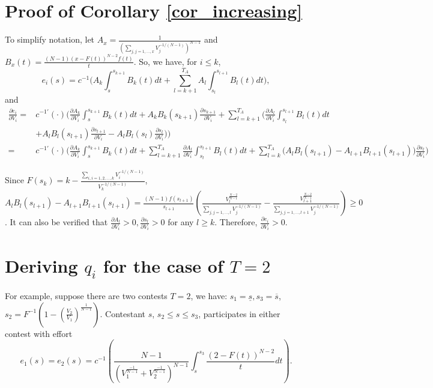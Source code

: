 \documentclass[12pt]{article}
\begin{document}
\section{Proof of Corollary \ref{cor_increasing}}

To simplify notation, let $A_{x}=\frac{1}{(\sum_{j,j=1,\dots,x}V_{j}^{-1/(N-1)})^{N-1}}$
and $B_{x}(t)=\frac{(N-1)(x-F(t))^{N-2}f(t)}{t}$. So, we have, for
$i\leq k$,
\[
e_{i}(s)=c^{-1}\Big(A_{k}\int_{s}^{s_{k+1}}B_{k}(t)dt+\sum_{l=k+1}^{T_{A}}A_{l}\int_{s_{l}}^{s_{l+1}}B_{l}(t)dt\Big),
\]
and
\begin{align*}
\frac{\partial e_{i}}{\partial V_{i}}= & c^{-1'}(\cdot)\Big(\frac{\partial A_{k}}{\partial V_{i}}\int_{s}^{s_{k+1}}B_{k}(t)dt+A_{k}B_{k}(s_{k+1})\frac{\partial s_{k+1}}{\partial V_{i}}+\sum_{l=k+1}^{T_{A}}\big(\frac{\partial A_{l}}{\partial V_{i}}\int_{s_{l}}^{s_{l+1}}B_{l}(t)dt\\
 & +A_{l}B_{l}(s_{l+1})\frac{\partial s_{l+1}}{\partial V_{i}}-A_{l}B_{l}(s_{l})\frac{\partial s_{l}}{\partial V_{i}}\big)\Big)\\
= & c^{-1'}(\cdot)\Big(\frac{\partial A_{k}}{\partial V_{i}}\int_{s}^{s_{k+1}}B_{k}(t)dt+\sum_{l=k+1}^{T_{A}}\frac{\partial A_{l}}{\partial V_{i}}\int_{s_{l}}^{s_{l+1}}B_{l}(t)dt+\sum_{l=k}^{T_{A}}\big(A_{l}B_{l}(s_{l+1})-A_{l+1}B_{l+1}(s_{l+1})\big)\frac{\partial s_{l}}{\partial V_{i}}\Big)
\end{align*}


Since $F(s_{k})=k-\frac{\sum_{i,i=1,2,\dots,k}V_{i}^{-1/(N-1)}}{V_{k}^{-1/(N-1)}}$,
$A_{l}B_{l}(s_{l+1})-A_{l+1}B_{l+1}(s_{l+1})=\frac{(N-1)f(s_{l+1})}{s_{l+1}}(\frac{V_{l}^{\frac{N-2}{N-1}}}{\sum_{j,j=1,\dots,l}V_{j}^{-1/(N-1)}}-\frac{V_{l+1}^{\frac{N-2}{N-1}}}{\sum_{j,j=1,\dots,l+1}V_{j}^{-1/(N-1)}})\geq0$.
It can also be verified that $\frac{\partial A_{l}}{\partial V_{i}}>0,\frac{\partial s_{l}}{\partial V_{i}}>0$
for any $l\geq k$. Therefore, $\frac{\partial e_{i}}{\partial V_{i}}>0$.

\section{Deriving $q_i$ for the case of $T=2$}

For example, suppose there are two contests $T=2$, we have: $s_{1}=\underline{s},s_{3}=\overline{s}$,
$s_{2}=F^{-1}(1-\left(\frac{V_{2}}{V_{1}}\right)^{\frac{1}{N-1}})$.
Contestant $s$, $s_{2}\leq s\leq s_{3}$, participates in either
contest with effort
\[
e_{1}(s)=e_{2}(s)=c^{-1}\left(\frac{N-1}{\left(V_{1}^{\frac{-1}{N-1}}+V_{2}^{\frac{-1}{N-1}}\right)^{N-1}}\int_{s}^{s_{3}}\frac{(2-F(t))^{N-2}}{t}dt\right).
\]
\end{document}
